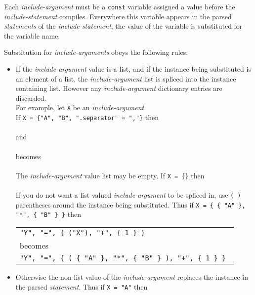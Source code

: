 \documentclass[12pt]{article}
\begin{document}
Each {\em include-argument} must be a {\tt const} variable assigned
a value before the {\em include-state\-ment} compiles.
Everywhere this variable
appears in the parsed {\em statements} of the {\em include-statement},
the value of the variable is substituted for the variable name.

Substitution for {\em include-arguments} obeys the following rules:
\begin{itemize}
\item \label{INCLUDE-SPLICING} If the {\em include-argument}
value is a list, and if the
instance being substituted is an element of a list,
the {\em include-argument} list is spliced into the instance containing
list.  However any {\em include-argument} dictionary entries are
discarded.
\\[0.5ex]
For example, let {\tt X} be an {\em include-argument}.
\\[0.5ex]
If {\tt X = \{"A", "B", ".separator" = ","\}} then \\
 \\
and \\
 \\
becomes \\
 \\
The {\em include-argument} value list may be empty.
If {\tt X = \{\}} then \\
 \\
If you do not want a list valued {\em include-argument} to be spliced in,
use {\tt (~)} parentheses around the instance being substituted.
Thus if {\tt X = \{ \{ "A" \}, "*",  \{ "B" \} \}} then \\
\hspace*{2em}%
     \begin{tabular}{l}
     \tt "Y", "=", \{ ("X"), "+", \{ 1 \} \} \\
     becomes \\
     \tt "Y", "=", \{ ( \{ "A" \}, "*", \{ "B" \} ), "+", \{ 1 \} \}
     \end{tabular}

\item Otherwise the non-list value of the {\em include-argument} replaces the
instance in the parsed {\em statement}.
Thus if {\tt X = "A"} then \\
\end{itemize}
\end{document}
